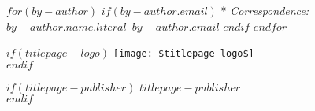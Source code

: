 \begin{minipage}[b][\textheight][s]{0.85\textwidth}
\vspace{1\baselineskip} 

$for(by-author)$
$if(by-author.email)$
* \textit{Correspondence:}~$by-author.name.literal$~$by-author.email$
$endif$
$endfor$


\vfill

$if(titlepage-logo)$
\texttt{[image: \$titlepage-logo\$]}\\
$endif$

\vspace{0.1\textheight} 

$if(titlepage-publisher)$
{\noindent $titlepage-publisher$}\\[\baselineskip]
$endif$
\end{minipage}
